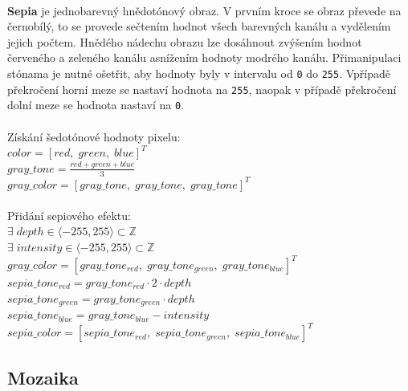 \documentclass[12pt]{scrartcl}
\begin{document}
\paragraph{}
\textbf{Sepia} je jednobarevný hnědotónový obraz. V prvním kroce se obraz převede na černobílý, to se provede sečtením hodnot všech barevných kanálu a vydělením jejich počtem. Hnědého nádechu obrazu lze dosáhnout zvýšením hodnot červeného a zeleného kanálu a\nobreakspace snížením hodnoty modrého kanálu. Při\nobreakspace manipulaci s\nobreakspace tónama je nutné ošetřit, aby hodnoty byly v intervalu od \texttt{0} do \texttt{255}. V\nobreakspace případě překročení horní meze se nastaví hodnota na \texttt{255}, naopak v případě překročení dolní meze se hodnota nastaví na \texttt{0}.\\\\
Získání šedotónové hodnoty pixelu: \\
$color = [red,\; green,\; blue]^T $ \\
$gray\_tone = \frac{red + green + blue}{3} $ \\
$gray\_color = [gray\_tone,\; gray\_tone,\; gray\_tone]^T $ \\\\
Přidání sepiového efektu: \\
$\exists \; depth \in \langle -255,255 \rangle \subset{\mathbb{Z}} $ \\
$\exists \; intensity \in \langle -255,255 \rangle \subset{\mathbb{Z}} $ \\
$ gray\_color = [gray\_tone_{red},\; gray\_tone_{green},\; gray\_tone_{blue}]^T $ \\
$ sepia\_tone_{red} = gray\_tone_{red} \cdot 2 \cdot depth$ \\
$ sepia\_tone_{green} = gray\_tone_{green} \cdot depth$ \\
$ sepia\_tone_{blue} = gray\_tone_{blue} - intensity$ \\
$ sepia\_color = [sepia\_tone_{red},\; sepia\_tone_{green},\; sepia\_tone_{blue}]^T $ \\
 

\subsection{Mozaika}
\end{document}
